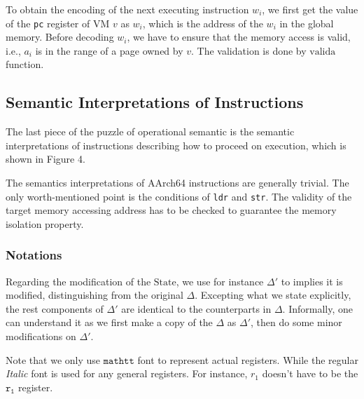 \documentclass[a4paper]{article}
\newcommand*{\STATE}{\text{State}}
\newcommand*{\instr}[1]{\texttt{#1}}
\newcommand*{\valida}{\text{valida}}
\begin{document}
To obtain the encoding of the next executing instruction $w_{i}$, we first get the
value of the \texttt{pc} register of VM $v$ as $w_{i}$, which is the address of the
$w_{i}$ in the global memory. Before decoding $w_{i}$, we have to ensure that the
memory access is valid, i.e., $a_{i}$ is in the range of a page owned by $v$.
The validation is done by $\valida$ function.


\subsection{Semantic Interpretations of Instructions}

The last piece of the puzzle of operational semantic
is the semantic interpretations of instructions describing how to proceed on
execution, which is shown in Figure 4.

The semantics interpretations of AArch64 instructions are generally
trivial. The only worth-mentioned point is the conditions of \instr{ldr} and
\instr{str}. The validity of the target memory accessing address has to be
checked to guarantee the memory isolation property.

\subsubsection{Notations}
Regarding the modification of the $\STATE$, we use for instance $\Delta'$ to
implies it is modified, distinguishing from the original $\Delta$. Excepting
what we state explicitly, the rest components of $\Delta'$ are identical to the
counterparts in $\Delta$. Informally, one can understand it as we first make a
copy of the $\Delta$ as $\Delta'$, then do some minor modifications on
$\Delta'$.

Note that we only use $\mathtt{mathtt}$ font to represent actual registers.
While the regular \emph{Italic} font is used for any general registers. For
instance, $r_{1}$ doesn't have to be the $\mathtt{r_{1}}$ register.
\end{document}
